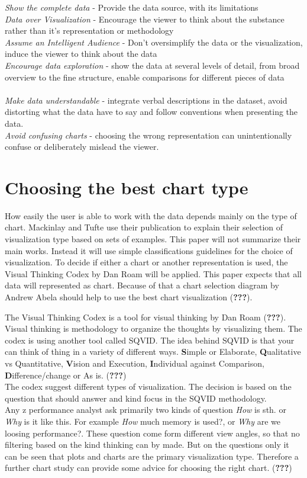 \documentclass[american,a4paper,oneside,,tablecaptionabove]{scrbook}
\begin{document}
\emph{Show the complete data} - Provide the data source, with its
limitations\\
\emph{Data over Visualization} - Encourage the viewer to think about the
substance rather than it's representation or methodology\\
\emph{Assume an Intelligent Audience} - Don't oversimplify the data or
the visualization, induce the viewer to think about the data\\
\emph{Encourage data exploration} - show the data at several levels of
detail, from broad overview to the fine structure, enable comparisons
for different pieces of data\\
\\
\emph{Make data understandable} - integrate verbal descriptions in the
dataset, avoid distorting what the data have to say and follow
conventions when presenting the data.\\
\emph{Avoid confusing charts} - choosing the wrong representation can
unintentionally confuse or deliberately mislead the viewer.

\section{Choosing the best chart
type}\label{choosing-the-best-chart-type}

How easily the user is able to work with the data depends mainly on the
type of chart. Mackinlay and Tufte use their publication to explain
their selection of visualization type based on sets of examples. This
paper will not summarize their main works. Instead it will use simple
classifications guidelines for the choice of visualization. To decide if
either a chart or another representation is used, the Visual Thinking
Codex by Dan Roam will be applied. This paper expects that all data will
represented as chart. Because of that a chart selection diagram by
Andrew Abela should help to use the best chart visualization
({\textbf{???}}).

The Visual Thinking Codex is a tool for visual thinking by Dan Roam
({\textbf{???}}). Visual thinking is methodology to organize the
thoughts by visualizing them. The codex is using another tool called
SQVID. The idea behind SQVID is that your can think of thing in a
variety of different ways. \textbf{S}imple or Elaborate,
\textbf{Q}ualitative vs Quantitative, \textbf{V}ision and Execution,
\textbf{I}ndividual against Comparison, \textbf{D}ifference/change or As
is. ({\textbf{???}})\\
The codex suggest different types of visualization. The decision is
based on the question that should answer and kind focus in the SQVID
methodology.\\
Any z performance analyst ask primarily two kinds of question \emph{How}
is sth. or \emph{Why} is it like this. For example \emph{How} much
memory is used?, or \emph{Why} are we loosing performance?. These
question come form different view angles, so that no filtering based on
the kind thinking can by made. But on the questions only it can be seen
that plots and charts are the primary visualization type. Therefore a
further chart study can provide some advice for choosing the right
chart. ({\textbf{???}})
\end{document}
